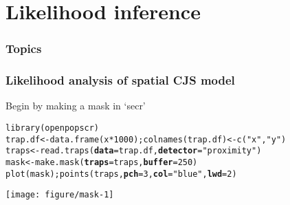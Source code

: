 \documentclass[color=usenames,dvipsnames]{beamer}\usepackage[]{graphicx}\usepackage[]{color}
\makeatletter
\newcommand{\hlnum}[1]{\textcolor[rgb]{0.69,0.494,0}{#1}}%
\newcommand{\hlstr}[1]{\textcolor[rgb]{0.749,0.012,0.012}{#1}}%
\newcommand{\hlopt}[1]{\textcolor[rgb]{0,0,0}{#1}}%
\newcommand{\hlstd}[1]{\textcolor[rgb]{0,0,0}{#1}}%
\newcommand{\hlkwb}[1]{\textcolor[rgb]{0,0.341,0.682}{#1}}%
\newcommand{\hlkwc}[1]{\textcolor[rgb]{0,0,0}{\textbf{#1}}}%
\newcommand{\hlkwd}[1]{\textcolor[rgb]{0.004,0.004,0.506}{#1}}%
\newenvironment{kframe}{%
 \def\at@end@of@kframe{}%
 \ifinner\ifhmode%
  \def\at@end@of@kframe{\end{minipage}}%
  \begin{minipage}{\columnwidth}%
 \fi\fi%
 \def\FrameCommand##1{\hskip\@totalleftmargin \hskip-\fboxsep
 \colorbox{shadecolor}{##1}\hskip-\fboxsep
     \hskip-\linewidth \hskip-\@totalleftmargin \hskip\columnwidth}%
 \MakeFramed {\advance\hsize-\width
   \@totalleftmargin\z@ \linewidth\hsize
   \@setminipage}}%
 {\par\unskip\endMakeFramed%
 \at@end@of@kframe}
\newenvironment{knitrout}{}{} %
\makeatother
\begin{document}
\section{Likelihood inference}



\begin{frame}[plain]
  \frametitle{Topics}
  \Large
  \tableofcontents[currentsection]
\end{frame}




\begin{frame}[fragile]
  \frametitle{Likelihood analysis of spatial CJS model}
Begin by making a mask in `secr'
\begin{knitrout}\scriptsize
{}\color{fgcolor}\begin{kframe}
\begin{alltt}
\hlkwd{library}\hlstd{(openpopscr)}
\hlstd{trap.df} \hlkwb{<-} \hlkwd{data.frame}\hlstd{(x}\hlopt{*}\hlnum{1000}\hlstd{);} \hlkwd{colnames}\hlstd{(trap.df)} \hlkwb{<-} \hlkwd{c}\hlstd{(}\hlstr{"x"}\hlstd{,}\hlstr{"y"}\hlstd{)}
\hlstd{traps} \hlkwb{<-} \hlkwd{read.traps}\hlstd{(}\hlkwc{data}\hlstd{=trap.df,} \hlkwc{detector}\hlstd{=}\hlstr{"proximity"}\hlstd{)}
\hlstd{mask} \hlkwb{<-} \hlkwd{make.mask}\hlstd{(}\hlkwc{traps}\hlstd{=traps,} \hlkwc{buffer}\hlstd{=}\hlnum{250}\hlstd{)}
\hlkwd{plot}\hlstd{(mask);} \hlkwd{points}\hlstd{(traps,} \hlkwc{pch}\hlstd{=}\hlnum{3}\hlstd{,} \hlkwc{col}\hlstd{=}\hlstr{"blue"}\hlstd{,} \hlkwc{lwd}\hlstd{=}\hlnum{2}\hlstd{)}
\end{alltt}
\end{kframe}

{\centering \texttt{[image: figure/mask-1]} 

}



\end{knitrout}
\end{frame}
\end{document}
